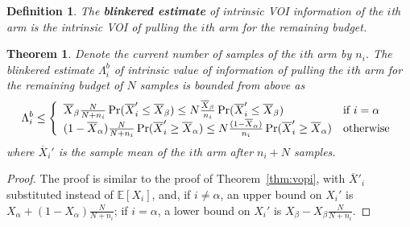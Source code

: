 \documentclass{article}
\newcommand {\IE} {\ensuremath {\mathbb{E}}}
\newtheorem{dfn}{Definition}
\newtheorem{thm}{Theorem}
\begin{document}
\begin{dfn} The \textbf{blinkered estimate} of intrinsic VOI information of the
  $i$th arm is the intrinsic VOI of pulling the $i$th arm for the
  remaining budget.
\end{dfn}

\begin{thm} Denote the current number of samples of the $i$th arm by
  $n_i$. The blinkered estimate $\Lambda_i^b$ of intrinsic value of
  information of pulling the $i$th arm for the remaining budget of $N$
  samples is bounded from above as
\begin{equation}
  \Lambda_i^b \le \left\{
  \begin{array}{l l}
    \overline X_\beta\frac N {N+n_i}\Pr(\overline X_i'\le\overline X_\beta)
    \le N\frac {\overline X_\beta} {n_i}\Pr(\overline X_i'\le\overline X_\beta) & \mbox{{\rm if} $i=\alpha$} \\
    (1-\overline  X_\alpha)\frac N {N+n_i}\Pr(\overline X_i'\ge\overline X_\alpha)
       \le N\frac {(1-\overline  X_\alpha)} {n_i}\Pr(\overline X_i'\ge\overline X_\alpha) & \mbox{\rm otherwise}
  \end{array} \right.
\label{eqn:thm-be}
\end{equation}
where $\overline X_i'$ is the sample mean of the $i$th arm after $n_i+N$ 
samples.
\label{thm:be}
\end{thm}

\begin{proof}
The proof is similar to the proof of Theorem~\ref{thm:vopi}, with
$\overline X'_i$ substituted instead of $\IE[X_i]$, and, if
$i\ne\alpha$, an upper bound on $X_i'$ is $X_\alpha+(1-X_\alpha)
\frac N {N+n_i}$; if $i=\alpha$, a lower bound on $X_i'$ is
$X_\beta - X_\beta \frac N {N+n_i}$.
\end{proof}
\end{document}
